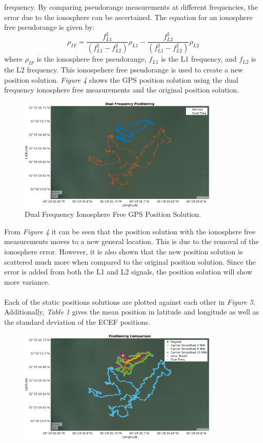 \documentclass[11pt]{article}
\begin{document}
\begin{enumerate}[label=\textbf{\arabic*.}]
    frequency. By comparing pseudorange measurements at different frequencies, 
    the error due to the ionosphere can be ascertained. The equation for an 
    ionosphere free pseudorange is given by:
    \begin{equation}
      \rho_{IF} = \dfrac{f_{L1}^2}{(f_{L1}^2-f_{L2}^2)}\rho_{L1} - 
                  \dfrac{f_{L2}^2}{(f_{L1}^2-f_{L2}^2)}\rho_{L2}
    \end{equation}
    where $\rho_{IF}$ is the ionosphere free pseudorange, $f_{L1}$ is the L1 
    frequency, and $f_{L2}$ is the L2 frequency. This ionospehere free pseudorange 
    is used to create a new position solution. \emph{Figure 4} shows the GPS 
    position solution using the dual frequency ionosphere free measurements and 
    the original position solution. 
    \begin{figure}[H]
        \centering
        \includegraphics[width=0.85\textwidth]{p1_d.png}
        \caption{Dual Frequency Ionosphere Free GPS Position Solution.}
    \end{figure}
    From \emph{Figure 4} it can be seen that the position solution with the 
    ionosphere free measurements moves to a new general location. This is due to 
    the removal of the ionosphere error. However, it is also shown that the new 
    position solution is scattered much more when compared to the original position 
    solution. Since the error is added from both the L1 and L2 signals, the 
    position solution will show more variance. 
    \\ \\
    Each of the static positions solutions are plotted against each other in 
    \emph{Figure 5}. Additionally, \emph{Table 1} gives the mean position in latitude 
    and longitude as well as the standard deviation of the ECEF positions.
    \begin{figure}[H]
        \centering
        \includegraphics[width=0.85\textwidth]{p1_f.png}

\end{figure}
\end{enumerate}
\end{document}
